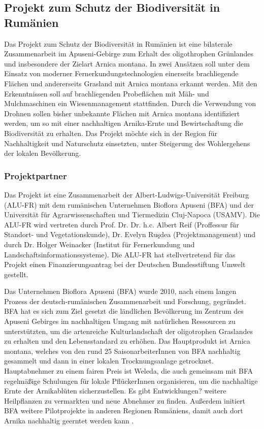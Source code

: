 \subsection{Projekt zum Schutz der Biodiversität in Rumänien}



Das Projekt zum Schutz der Biodiversität in Rumänien ist eine bilaterale Zusammenarbeit im Apuseni-Gebirge zum Erhalt des oligothrophen Grünlandes und insbesondere der Zielart Arnica montana. In zwei Ansätzen soll unter dem Einsatz von moderner Fernerkundungstechnologien einerseits brachliegende Flächen und andererseits Grasland mit Arnica montana erkannt werden. Mit den Erkenntnissen soll auf brachliegenden Probeflächen mit Mäh- und Mulchmaschinen ein Wiesenmanagement stattfinden. Durch die Verwendung von Drohnen sollen bisher unbekannte Flächen mit Arnica montana identifiziert werden, um so mit einer nachhaltigen Arnika-Ernte und Bewirtschaftung die Biodiversität zu erhalten. Das Projekt möchte sich in der Region für Nachhaltigkeit und Naturschutz einsetzten, unter Steigerung des Wohlergehens der lokalen Bevölkerung. 

\subsubsection{Projektpartner}
Das Projekt ist eine Zusammenarbeit der Albert-Ludwigs-Universität Freiburg (ALU-FR) mit dem rumänischen Unternehmen Bioflora Apuseni (BFA) und der Universität für Agrarwissenschaften und Tiermedizin Cluj-Napoca (USAMV). Die ALU-FR wird vertreten durch Prof. Dr. Dr. h.c. Albert Reif (Proffessur für Standort- und Vegetationskunde), Dr. Evelyn Ruşdea  (Projektmanagement) und durch Dr. Holger Weinacker (Institut für Fernerkundung und Landschaftsinformationssysteme). Die ALU-FR hat stellvertretend für das Projekt einen Finanzierungsantrag bei der Deutschen Bundesstiftung Umwelt gestellt.

Das Unternehmen Bioflora Apuseni (BFA) wurde 2010, nach einem langen Prozess der deutsch-rumänischen Zusammenarbeit und Forschung, gegründet. BFA hat es sich zum Ziel gesetzt die ländlichen Bevölkerung im Zentrum des Apuseni Gebirges im nachhaltigen Umgang mit natürlichen Ressourcen zu unterstützten, um die artenreiche Kulturlandschaft der oligotrophen Graslandes zu erhalten und den Lebensstandard zu erhöhen. Das Hauptprodukt ist Arnica montana, welches von den rund 25 SaisonarbeiterInnen von BFA nachhaltig gesammelt und dann in einer lokalen Trocknungsanlage getrocknet. Hauptabnehmer zu einem fairen Preis ist Weleda, die auch gemeinsam mit BFA regelmäßige Schulungen für lokale PflückerInnen organisieren, um die nachhaltige Ernte der Arnikablüten sicherzustellen. Es gibt Entwicklungen? weitere Heilpflanzen zu vermarkten und neue Abnehmer zu finden. Außerdem initiert BFA weitere Pilotprojekte in anderen Regionen Rumäniens, damit auch dort Arnika nachhaltig geerntet werden kann \citep[vgl.][]{ECOKARST2018,DBU2018}.

